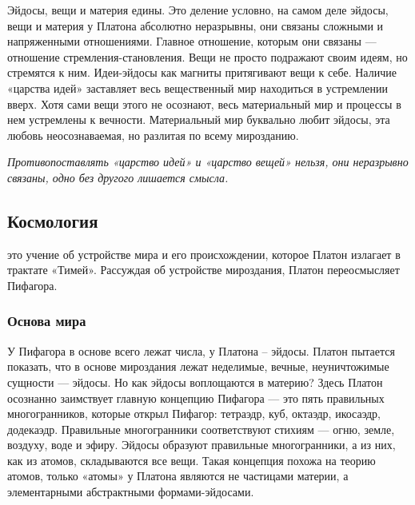 \documentclass[
]{article}
\providecommand{\tightlist}{%
  \setlength{\itemsep}{0pt}\setlength{\parskip}{0pt}}
\begin{document}
Эйдосы, вещи и материя едины. Это деление условно, на самом деле эйдосы,
вещи и материя у Платона абсолютно неразрывны, они связаны сложными и
напряженными отношениями. Главное отношение, которым они связаны ---
отношение стремления-становления. Вещи не просто подражают своим идеям,
но стремятся к ним. Идеи-эйдосы как магниты притягивают вещи к себе.
Наличие «царства идей» заставляет весь вещественный мир находиться в
устремлении вверх. Хотя сами вещи этого не осознают, весь материальный
мир и процессы в нем устремлены к вечности. Материальный мир буквально
любит эйдосы, эта любовь неосознаваемая, но разлитая по всему
мирозданию.

\emph{Противопоставлять «царство идей» и «царство вещей» нельзя, они
неразрывно связаны, одно без другого лишается смысла.}

\hypertarget{ux43aux43eux441ux43cux43eux43bux43eux433ux438ux44f}{%
\subsection{Космология}\label{ux43aux43eux441ux43cux43eux43bux43eux433ux438ux44f}}

\begin{description}
\tightlist
\item[\emph{Космология --}]
это учение об устройстве мира и его происхождении, которое Платон
излагает в трактате «Тимей». Рассуждая об устройстве мироздания, Платон
переосмысляет Пифагора.
\end{description}

\hypertarget{ux43eux441ux43dux43eux432ux430-ux43cux438ux440ux430}{%
\subsubsection{Основа
мира}\label{ux43eux441ux43dux43eux432ux430-ux43cux438ux440ux430}}

У Пифагора в основе всего лежат числа, у Платона -- эйдосы. Платон
пытается показать, что в основе мироздания лежат неделимые, вечные,
неуничтожимые сущности --- эйдосы. Но как эйдосы воплощаются в материю?
Здесь Платон осознанно заимствует главную концепцию Пифагора --- это
пять правильных многогранников, которые открыл Пифагор: тетраэдр, куб,
октаэдр, икосаэдр, додекаэдр. Правильные многогранники соответствуют
стихиям --- огню, земле, воздуху, воде и эфиру. Эйдосы образуют
правильные многогранники, а из них, как из атомов, складываются все
вещи. Такая концепция похожа на теорию атомов, только «атомы» у Платона
являются не частицами материи, а элементарными абстрактными
формами-эйдосами.
\end{document}
